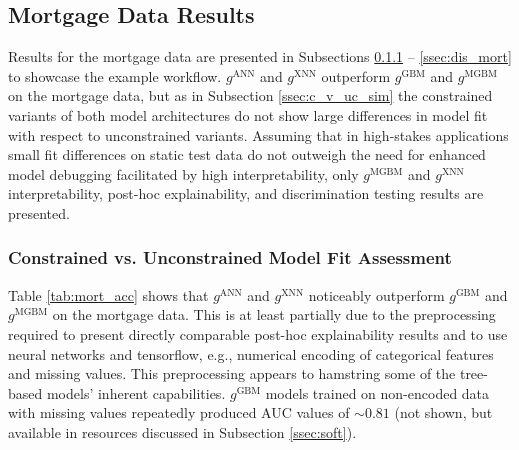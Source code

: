 \documentclass[information,article,submit,moreauthors,pdftex]{definitions/mdpi}
\begin{document}
\subsection{Mortgage Data Results}

Results for the mortgage data are presented in Subsections \ref{ssec:c_v_uc_mort} -- \ref{ssec:dis_mort} to showcase the example workflow.  $g^\text{ANN}$ and $g^\text{XNN}$ outperform $g^\text{GBM}$ and $g^\text{MGBM}$ on the mortgage data, but as in Subsection \ref{ssec:c_v_uc_sim} the constrained variants of both model architectures do not show large differences in model fit with respect to unconstrained variants. Assuming that in high-stakes applications small fit differences on static test data do not outweigh the need for enhanced model debugging facilitated by high interpretability, only $g^\text{MGBM}$ and $g^\text{XNN}$ interpretability, post-hoc explainability, and discrimination testing results are presented. 

\subsubsection{Constrained vs. Unconstrained Model Fit Assessment}\label{ssec:c_v_uc_mort}

Table \ref{tab:mort_acc} shows that $g^\text{ANN}$ and $g^\text{XNN}$ noticeably outperform $g^\text{GBM}$ and $g^\text{MGBM}$ on the mortgage data. This is at least partially due to the preprocessing required to present directly comparable post-hoc explainability results and to use neural networks and tensorflow, e.g., numerical encoding of categorical features and missing values. This preprocessing appears to hamstring some of the tree-based models' inherent capabilities. $g^\text{GBM}$ models trained on non-encoded data with missing values repeatedly produced AUC values of $\sim0.81$ (not shown, but available in resources discussed in Subsection \ref{ssec:soft}). 
\end{document}
